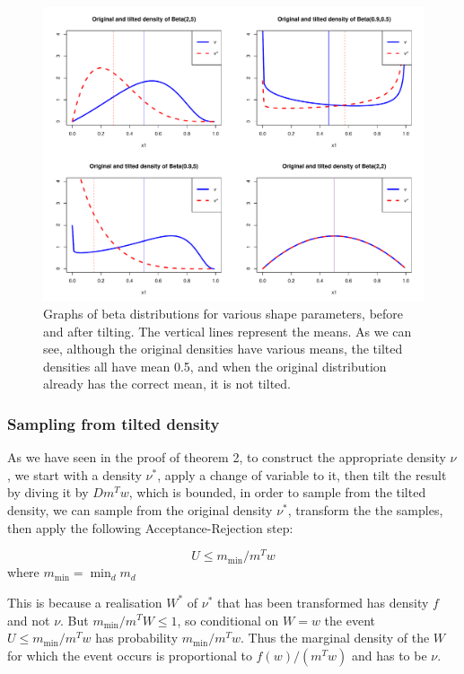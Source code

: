 \begin{figure}[h]
\centering
\includegraphics[width=\textwidth]{density_tilt.pdf}
\caption{Graphs of beta distributions for various shape parameters, before and after tilting. The vertical lines represent the means. As we can see, although the original densities have various means, the tilted densities all have mean 0.5, and when the original distribution already has the correct mean, it is not tilted.}
\label{fig:density_tilt}
\end{figure}

\subsubsection{Sampling from tilted density}
As we have seen in the proof of theorem 2, to construct the appropriate density $\nu$, we start with a density $\nu^*$, apply a change of variable to it, then tilt the result by diving it by $Dm^Tw$, which is bounded, in order to sample from the tilted density, we can sample from the original density $\nu^*$, transform the the samples, then apply the following Acceptance-Rejection step:

$$
U\leq m_{\min}/m^Tw
$$
where $m_{\min} = \min_d m_d$

This is because a realisation $W^*$ of $\nu^*$ that has been transformed has density $f$ and not $\nu$. But $m_{\min}/m^TW \leq 1$, so conditional on $W=w$ the event $U \leq m_{\min} /m^Tw$ has probability $m_{\min}/m^Tw$. Thus the marginal density of the $W$ for which the event occurs is proportional to $f(w)/(m^Tw)$ and has to be $\nu$.

